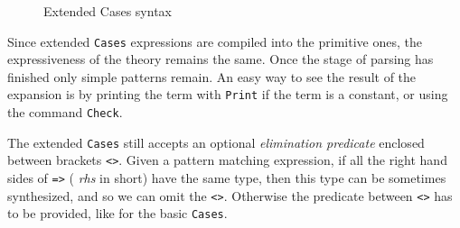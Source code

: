 \begin{figure}[t]
\begin{center}
\end{center}
\caption{Extended Cases syntax}
\label{cases-grammar}
\end{figure}

Since extended {\tt Cases} expressions are compiled into the primitive
ones, the expressiveness of the theory remains the same. Once the
stage of parsing has finished only simple patterns remain. An easy way
to see the result of the expansion is by printing the term with
\texttt{Print} if the term is a constant, or using the command
\texttt{Check}.

The extended \texttt{Cases} still accepts an optional {\em elimination
predicate} enclosed between brackets \texttt{<>}.  Given a pattern
matching expression, if all the right hand sides of \texttt{=>} ({\em
rhs} in short) have the same type, then this type can be sometimes
synthesized, and so we can omit the \texttt{<>}. Otherwise 
the predicate between \texttt{<>} has to be provided, like for the basic
\texttt{Cases}.

